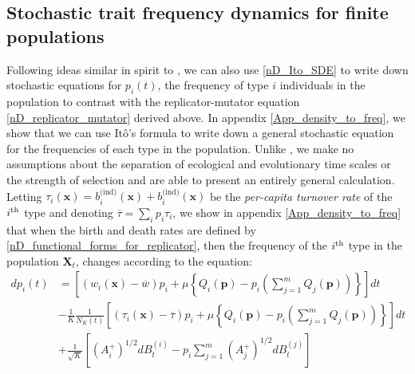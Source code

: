 \subsection{Stochastic trait frequency dynamics for finite populations}

Following ideas similar in spirit to \citep{mcleod_social_2019}, we can also use \eqref{nD_Ito_SDE} to write down stochastic equations for $p_i(t)$, the frequency of type $i$ individuals in the population to contrast with the replicator-mutator equation \eqref{nD_replicator_mutator} derived above. In appendix \ref{App_density_to_freq}, we show that we can use It\^{o}'s formula to write  down a general stochastic equation for the frequencies of each type in the population. Unlike \citep{mcleod_social_2019}, we make no assumptions about the separation of ecological and evolutionary time scales or the strength of selection and are able to present an entirely general calculation. Letting $\tau_i(\mathbf{x}) = b^{\textrm{(ind)}}_{i}(\mathbf{x}) + b^{\textrm{(ind)}}_{i}(\mathbf{x})$ be the \emph{per-capita turnover rate} of the $i\textsuperscript{th}$ type and denoting $\overline{\tau} = \sum_i p_i\tau_i$, we show in appendix \ref{App_density_to_freq} that when the birth and death rates are defined by \eqref{nD_functional_forms_for_replicator}, then the frequency of the $i\textsuperscript{th}$ type in the population $\mathbf{X}_t$, changes according to the equation:
\begin{equation}
\label{nD_eqn_for_frequencies}
\begin{aligned}
dp_i(t) &= \left[(w_i(\mathbf{x}) - \overline{w})p_i + \mu\left\{Q_i(\mathbf{p}) - p_i\left(\sum\limits_{j=1}^{m}Q_j(\mathbf{p})\right)\right\}\right]dt\\
&- \frac{1}{K}\frac{1}{N_{K}(t)}\left[(\tau_i(\mathbf{x}) - \overline{\tau})p_i + \mu\left\{Q_i(\mathbf{p}) - p_i\left(\sum\limits_{j=1}^{m}Q_j(\mathbf{p})\right)\right\}\right]dt\\
&+ \frac{1}{\sqrt{K}}\left[\left(A^{+}_{i}\right)^{1/2}dB^{(i)}_t - p_i\sum\limits_{j=1}^{m}\left(A^{+}_{j}\right)^{1/2}dB^{(j)}_t\right]
\end{aligned}
\end{equation}
